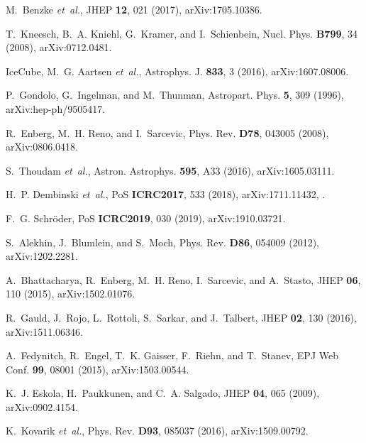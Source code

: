 \documentclass[a4paper,11pt]{article}
\begin{document}
\begin{thebibliography}{99}
M.~Benzke {\em et~al.},
\newblock JHEP {\bf 12}, 021 (2017), arXiv:1705.10386.

T.~Kneesch, B.~A. Kniehl, G.~Kramer, and I.~Schienbein,
\newblock Nucl. Phys. {\bf B799}, 34 (2008), arXiv:0712.0481.

IceCube, M.~G. Aartsen {\em et~al.},
\newblock Astrophys. J. {\bf 833}, 3 (2016), arXiv:1607.08006.

P.~Gondolo, G.~Ingelman, and M.~Thunman,
\newblock Astropart. Phys. {\bf 5}, 309 (1996), arXiv:hep-ph/9505417.

R.~Enberg, M.~H. Reno, and I.~Sarcevic,
\newblock Phys. Rev. {\bf D78}, 043005 (2008), arXiv:0806.0418.

S.~Thoudam {\em et~al.},
\newblock Astron. Astrophys. {\bf 595}, A33 (2016), arXiv:1605.03111.

H.~P. Dembinski {\em et~al.},
\newblock PoS {\bf ICRC2017}, 533 (2018), arXiv:1711.11432,
\newblock [35,533(2017)].

F.~G. Schr{\"o}der,
\newblock PoS {\bf ICRC2019}, 030 (2019), arXiv:1910.03721.

S.~Alekhin, J.~Blumlein, and S.~Moch,
\newblock Phys. Rev. {\bf D86}, 054009 (2012), arXiv:1202.2281.

A.~Bhattacharya, R.~Enberg, M.~H. Reno, I.~Sarcevic, and A.~Stasto,
\newblock JHEP {\bf 06}, 110 (2015), arXiv:1502.01076.

R.~Gauld, J.~Rojo, L.~Rottoli, S.~Sarkar, and J.~Talbert,
\newblock JHEP {\bf 02}, 130 (2016), arXiv:1511.06346.

A.~Fedynitch, R.~Engel, T.~K. Gaisser, F.~Riehn, and T.~Stanev,
\newblock EPJ Web Conf. {\bf 99}, 08001 (2015), arXiv:1503.00544.

K.~J. Eskola, H.~Paukkunen, and C.~A. Salgado,
\newblock JHEP {\bf 04}, 065 (2009), arXiv:0902.4154.

K.~Kovarik {\em et~al.},
\newblock Phys. Rev. {\bf D93}, 085037 (2016), arXiv:1509.00792.




\end{thebibliography}
\end{document}
